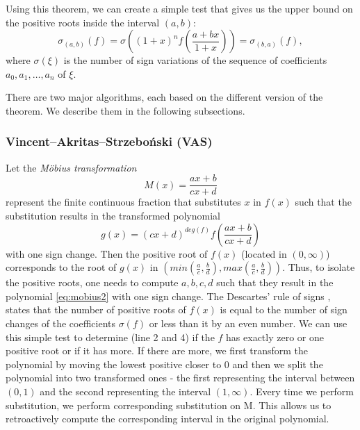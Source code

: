 \documentclass[
  digital, %
  notable,   %
  nolof,     %
  nolot,     %
	final, %
]{fithesis3}
\begin{document}
Using this theorem, we can create a simple test that gives us the upper bound on the positive roots inside the interval $(a,b)$:
\begin{equation}
\sigma_{\left(a,b\right)}(f) = \sigma\left((1 + x)^{n} f\left(\frac{a + bx}{1 + x}\right)\right) = \sigma_{\left(b,a\right)}(f),
\label{eq:a_b_test}
\end{equation}
where $\sigma(\xi)$ is the number of sign variations of the sequence of coefficients $a_{0}, a_{1},\ldots,a_{n}$ of $\xi$.

There are two major algorithms, each based on the different version of the theorem. We describe them in the following subsections.
\subsubsection{\textbf{Vincent–Akritas–Strzeboński (VAS)} \parencite{vas}}
Let the \textit{M{\"o}bius transformation} \parencite{mobius}
\begin{equation}
M(x) = \frac{ax+b}{cx+d} \tag*{$a,b,c,d\in\N;ad-bd\neq 0$}
\label{eq:mobius}
\end{equation}
represent the finite continuous fraction that substitutes $x$ in $f(x)$ such that the substitution results in the transformed polynomial 
\begin{equation}
\label{eq:mobius2}
g(x)=(cx+d)^{deg(f)}f\left(\frac{ax+b}{cx+d}\right)
\end{equation} with one sign change. Then the positive root of $f(x)$ (located in $(0,\infty)$) corresponds to the root of $g(x)$ in $(min(\frac{a}{c},\frac{b}{d}), max(\frac{a}{c},\frac{b}{d}))$. Thus, to isolate the positive roots, one needs to compute $a,b,c,d$ such that they result in the polynomial \eqref{eq:mobius2} with one sign change.
The Descartes' rule of signs \parencite{descart}, states that the number of positive roots of $f(x)$ is equal to the number of sign changes of the coefficients $\sigma(f)$ or less than it by an even number. We can use this simple test to determine (line 2 and 4) if the $f$ has exactly zero or one positive root or if it has more. If there are more, we first transform the polynomial by moving the lowest positive closer to 0 and then we split the polynomial into two transformed ones - the first representing the interval between $(0,1)$ and the second representing the interval $(1,\infty)$. Every time we perform substitution, we perform corresponding substitution on M. This allows us to retroactively compute the corresponding interval in the original polynomial.
\end{document}
